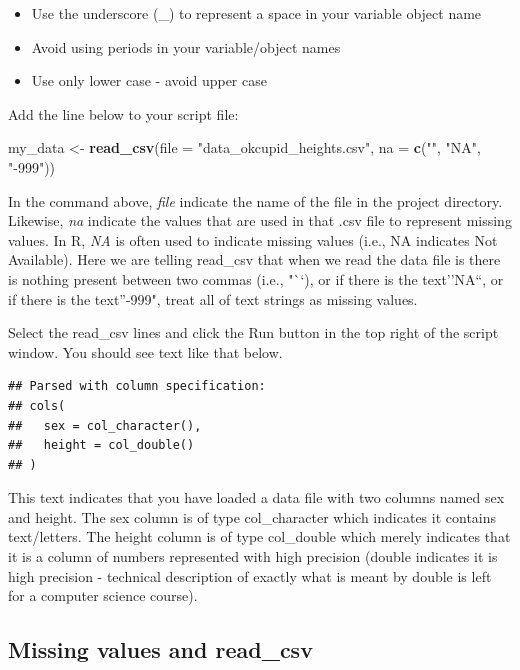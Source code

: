 \documentclass[
]{krantz}
\makeatletter
\newenvironment{Shaded}{\begin{snugshade}}{\end{snugshade}}
\newcommand{\DataTypeTok}[1]{\textcolor[rgb]{0.27,0.27,0.27}{#1}}
\newcommand{\KeywordTok}[1]{\textcolor[rgb]{0.27,0.27,0.27}{\textbf{#1}}}
\newcommand{\NormalTok}[1]{#1}
\newcommand{\StringTok}[1]{\textcolor[rgb]{0.5,0.5,0.5}{#1}}
\providecommand{\tightlist}{%
  \setlength{\itemsep}{0pt}\setlength{\parskip}{0pt}}
\newenvironment{kframe}{%
\medskip{}
\setlength{\fboxsep}{.8em}
 \def\at@end@of@kframe{}%
 \ifinner\ifhmode%
  \def\at@end@of@kframe{\end{minipage}}%
  \begin{minipage}{\columnwidth}%
 \fi\fi%
 \def\FrameCommand##1{\hskip\@totalleftmargin \hskip-\fboxsep
 \colorbox{shadecolor}{##1}\hskip-\fboxsep
     \hskip-\linewidth \hskip-\@totalleftmargin \hskip\columnwidth}%
 \MakeFramed {\advance\hsize-\width
   \@totalleftmargin\z@ \linewidth\hsize
   \@setminipage}}%
 {\par\unskip\endMakeFramed%
 \at@end@of@kframe}
\renewenvironment{Shaded}{\begin{kframe}}{\end{kframe}}
\makeatother
\begin{document}
\begin{itemize}
\tightlist
\item
  Use the underscore (\_) to represent a space in your variable object name
\item
  Avoid using periods in your variable/object names
\item
  Use only lower case - avoid upper case
\end{itemize}

Add the line below to your script file:

\begin{Shaded}
\begin{Highlighting}[]
\NormalTok{my_data <-}\StringTok{ }\KeywordTok{read_csv}\NormalTok{(}\DataTypeTok{file =} \StringTok{"data_okcupid_heights.csv"}\NormalTok{, }
                    \DataTypeTok{na =} \KeywordTok{c}\NormalTok{(}\StringTok{""}\NormalTok{, }\StringTok{"NA"}\NormalTok{, }\StringTok{"-999"}\NormalTok{))}
\end{Highlighting}
\end{Shaded}

In the command above, \emph{file} indicate the name of the file in the project directory. Likewise, \emph{na} indicate the values that are used in that .csv file to represent missing values. In R, \emph{NA} is often used to indicate missing values (i.e., NA indicates Not Available). Here we are telling read\_csv that when we read the data file is there is nothing present between two commas (i.e., "``), or if there is the text''NA``, or if there is the text''-999", treat all of text strings as missing values.

Select the read\_csv lines and click the Run button in the top right of the script window. You should see text like that below.

\begin{verbatim}
## Parsed with column specification:
## cols(
##   sex = col_character(),
##   height = col_double()
## )
\end{verbatim}

This text indicates that you have loaded a data file with two columns named sex and height. The sex column is of type col\_character which indicates it contains text/letters. The height column is of type col\_double which merely indicates that it is a column of numbers represented with high precision (double indicates it is high precision - technical description of exactly what is meant by double is left for a computer science course).

\hypertarget{missing-values-and-read_csv}{%
\subsection{Missing values and read\_csv}\label{missing-values-and-read_csv}}
\end{document}
